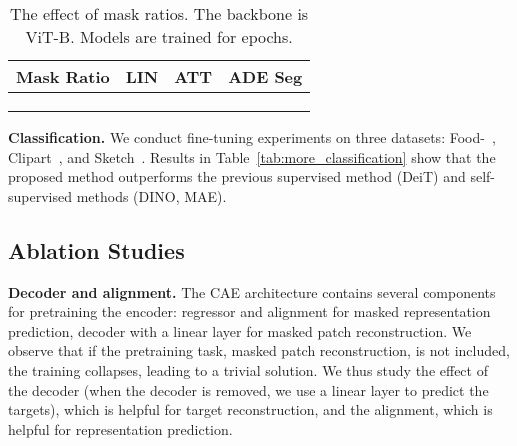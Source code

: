 \documentclass[twocolumn]{svjour3}          \smartqed  \usepackage{graphicx}
\begin{document}
\begin{table}[t]
  \centering
  \caption{The effect of mask ratios. The backbone is ViT-B. Models are trained for  epochs.} 
  \setlength{\tabcolsep}{15pt}
\renewcommand{\arraystretch}{1.1}
        \begin{tabular}{ c  c  c c }
            \toprule
            {Mask Ratio} & {LIN} & {ATT} & ADE Seg \\
              \hline
               &  & 		&  \\
               &  & 		&  \\
               &  & 		&  \\
            \bottomrule
        \end{tabular} 
        \label{tab:mask_ratio}
\end{table}




\vspace{1mm}
\noindent\textbf{Classification.} 
We conduct fine-tuning experiments on three datasets: Food-~\cite{bossard14}, Clipart~\cite{castrejon2016learning}, and Sketch~\cite{castrejon2016learning}. Results in Table~\ref{tab:more_classification} show that the proposed method outperforms the previous supervised method (DeiT) and self-supervised methods (DINO, MAE).






\subsection{Ablation Studies}



\noindent \textbf{Decoder and alignment.}
The CAE architecture contains
several components for pretraining the encoder:
regressor
and alignment for masked representation prediction,
decoder with a linear layer for masked
patch reconstruction.
We observe that
if the pretraining task,
masked patch reconstruction, is not included,
the training collapses, leading to a trivial solution. 
We thus study
the effect of 
the decoder
(when the decoder is removed, we
use a linear layer to predict the targets),
which is helpful for target reconstruction,
and the alignment,
which is helpful for representation prediction.  
\end{document}
